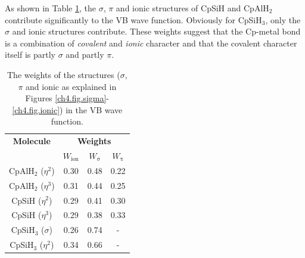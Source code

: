 As shown in Table \ref{ch4.tab.weights}, the $\sigma$, $\pi$ and ionic structures of CpSiH and CpAlH$_2$ contribute significantly to the VB wave function. Obviously for CpSiH$_3$, only the $\sigma$ and ionic structures contribute. These weights suggest that the Cp-metal bond is a combination of \textit{covalent} and \textit{ionic} character and that the covalent character itself is partly $\sigma$ and partly $\pi$.
\begin{table}[htbp]
\caption{The weights \cite{coulson} of the structures ($\sigma$, $\pi$ and ionic as explained in Figures \ref{ch4.fig.sigma}-\ref{ch4.fig.ionic}) in the VB wave function.}
\center
\begin{tabular}{|c|ccc|}
\hline
\textbf{Molecule}&
\multicolumn{3}{c|}{\textbf{Weights}}\\
&$W_\mathrm{ion}$&
$W_\mathrm{\sigma}$&
$W_\mathrm{\pi}$\\
\hline
CpAlH$_2$ ($\eta^{2}$)&0.30&0.48&0.22\\
CpAlH$_2$ ($\eta^{3}$)&0.31&0.44&0.25\\
CpSiH ($\eta^{2}$)&0.29&0.41&0.30\\
CpSiH ($\eta^{3}$)&0.29&0.38&0.33\\
CpSiH$_3$ ($\sigma$)&0.26&0.74&-\\
CpSiH$_3$ ($\eta^{2}$)&0.34&0.66&-\\
\hline
\end{tabular}
\label{ch4.tab.weights}
\end{table}

